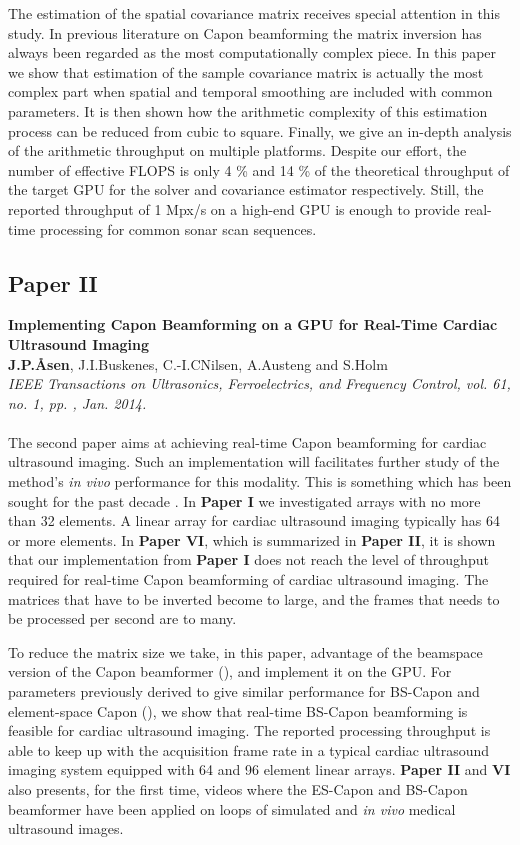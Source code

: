 The estimation of the spatial covariance matrix receives special attention in this study. In previous literature on Capon beamforming the matrix inversion has always been regarded as the most computationally complex piece. In this paper we show that estimation of the sample covariance matrix is actually the most complex part when spatial and temporal smoothing are included with common parameters. It is then shown how the arithmetic complexity of this estimation process can be reduced from cubic to square. Finally, we give an in-depth analysis of the arithmetic throughput on multiple platforms. Despite our effort, the number of effective FLOPS is only 4 \% and 14 \% of the theoretical throughput of the target GPU for the solver and covariance estimator respectively. Still, the reported throughput of 1 Mpx/s on a high-end GPU is enough to provide real-time processing for common sonar scan sequences.

\subsection{Paper II}
\textbf{Implementing Capon Beamforming on a GPU for Real-Time Cardiac Ultrasound Imaging}\\
\textbf{J.\:P.\:\AA{}sen}, J.\:I.\:Buskenes, C.-I.\:C\:Nilsen, A.\:Austeng and S.\:Holm\\
{\it IEEE Transactions on Ultrasonics, Ferroelectrics, and Frequency Control, vol. 61, no. 1, pp. , Jan. 2014.}\\\\
The second paper aims at achieving real-time Capon beamforming for cardiac ultrasound imaging. Such an implementation will facilitates further study of the method's \textit{in vivo} performance for this modality. This is something which has been sought for the past decade . In \textbf{Paper I} we investigated arrays with no more than 32 elements. A linear array for cardiac ultrasound imaging typically has 64 or more elements. In \textbf{Paper VI}, which is summarized in \textbf{Paper II}, it is shown that our implementation from  \textbf{Paper I} does not reach the level of throughput required for real-time Capon beamforming of cardiac ultrasound imaging. The matrices that have to be inverted become to large, and the frames that needs to be processed per second are to many.

To reduce the matrix size we take, in this paper, advantage of the beamspace version of the Capon beamformer (), and implement it on the GPU. For parameters previously derived to give similar performance for BS-Capon and element-space Capon (), we show that real-time BS-Capon beamforming is feasible for cardiac ultrasound imaging. The reported processing throughput is able to keep up with the acquisition frame rate in a typical cardiac ultrasound imaging system equipped with 64 and 96 element linear arrays.  \textbf{Paper II} and \textbf{VI} also presents, for the first time, videos where the ES-Capon and BS-Capon beamformer have been applied on loops of simulated and \textit{in vivo} medical ultrasound images.

